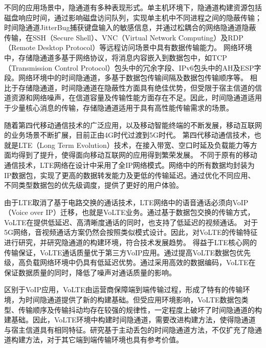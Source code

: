 不同的应用场景中，隐通道有多种表现形式。单主机环境下，隐通道构建资源包括磁盘响应时间，通过影响磁盘访问队列，实现单主机中不同进程之间的隐蔽传输；时间隐通道JitterBug捕获键盘输入的敏感信息，并通过松耦合的网络隐通道隐蔽传输，在SSH（Secure Shell）、VNC（Virtual Network Computing）及RDP（Remote Desktop Protocol）等远程访问场景中具有数据传输能力。
网络环境中，存储隐通道多基于网络协议，将消息内容嵌入到数据包中，如TCP（Transmission Control Protocol）包头中的冗余字段、IPv6包头中的AH及ESP字段。网络环境中的时间隐通道，多基于数据包传输间隔及数据包传输顺序等。
相比于存储隐通道，时间隐通道在隐蔽性方面具有绝佳优势，但受限于宿主信道的信道资源和网络噪声，在信道容量及传输性能方面存在不足。因此，时间隐通道适用于少量核心消息的传输，存储隐通道适用于具有高性能传输需求的场景。

随着第四代移动通信技术的广泛应用，以及移动智能终端的不断发展，移动互联网的业务场景不断扩展，目前正由4G时代过渡到5G时代。
第四代移动通信技术，也就是LTE（Long Term Evolution）技术，在接入带宽、空口时延及负载能力等方面均得到了提升，使得面向移动互联网的应用得到繁荣发展。
不同于原有的移动通信技术，LTE网络在设计中采用了全IP网络模式。网络中的所有数据均封装为IP数据包，实现了更高的数据转发能力及更低的传输延迟。通过优化不同应用、不同类型数据包的优先级调度，提供了更好的用户体验。

由于LTE取消了基于电路交换的通话技术，LTE网络中的语音通话必须向VoIP（Voice over IP）迁移，也就是VoLTE业务。通过基于数据包交换的传输方式，VoLTE在提供低延迟、高清晰度通话的同时，也支持了低延迟的视频通话。
对于5G网络，音视频通话方案仍然会按照类似模式设计。因此，对VoLTE的传输特征进行研究，并研究隐通道的构建环境，符合技术发展趋势。
得益于LTE核心网的传输保证，VoLTE通话质量优于第三方VoIP应用。通过提高VoLTE数据包优先级，高负载网络环境中仍具有低延迟优势。通过采用高效的数据编码，VoLTE在保证数据质量的同时，降低了噪声对通话质量的影响。

区别于VoIP应用，VoLTE由运营商保障端到端传输过程，形成了特有的传输环境，为时间隐通道提供了新的构建基础。但受应用环境影响，VoLTE数据包类型、传输顺序及传输抖动均存在较强的规律性，一定程度上破坏了时间隐通道的构建基础。因此，VoLTE环境中构建时间隐通道，需要改进构建方法，使得隐通道与宿主信道具有相同特征。研究基于主动丢包的时间隐通道方法，不仅扩充了隐通道构建方法，对于其它端到端传输环境也具有参考价值。